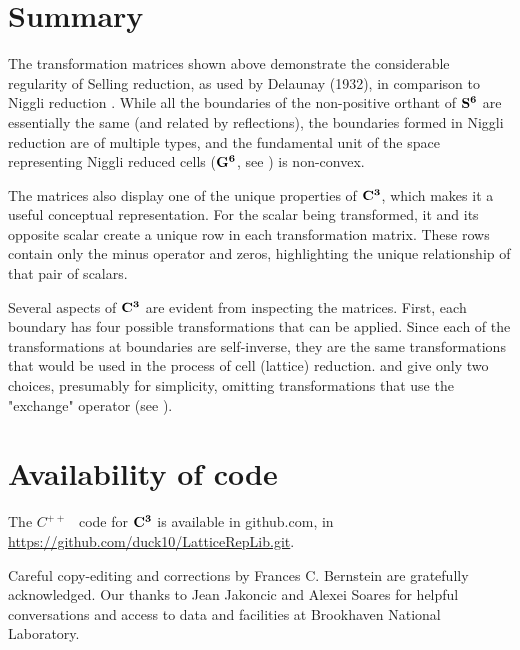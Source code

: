 \documentclass[preprint]{iucr}              %
\numberwithin{equation}{section}
\newcommand{\SVI}[0]{$\bf{S^{6}}$}
\newcommand{\GVI}[0]{$\bf{G^{6}}$}
\newcommand{\CIII}[0]{$\bf{C^{3}}$}
\begin{document}
	\section{Summary}
	
The transformation matrices shown above demonstrate the 
considerable regularity of Selling reduction, as used by 
Delaunay (1932), in comparison to Niggli 
reduction \cite{Niggli1928}. While all the boundaries of the non-positive 
orthant of \SVI{} are essentially the same (and 
related by reflections), the boundaries formed in 
Niggli reduction are of multiple types, and the fundamental unit 
of the space representing Niggli reduced cells (\GVI{}, see ) is non-convex.

The matrices also display one of the unique properties of \CIII{}, 
which makes it a useful conceptual representation. 
For the scalar being transformed, it and its opposite scalar
create a unique row in each transformation matrix. These rows contain only
the minus operator and zeros, highlighting the 
unique relationship of that pair of scalars.

Several aspects of \CIII{} are evident from inspecting the matrices. 
First, each boundary has four possible 
transformations that can be applied. Since each of 
the transformations at boundaries are self-inverse, they are the 
same transformations that would be used in the process of 
cell (lattice) reduction.  and  give only two choices, presumably for simplicity, 
omitting transformations that use the "exchange" operator 
(see ).

	
	
	
	
	
	\section{Availability of code}
	
	The $C^{++}$ ~code for \CIII{} is available in github.com, in
	\url{https://github.com/duck10/LatticeRepLib.git}.
	
	
	
	
	Careful copy-editing and corrections by Frances C. Bernstein are 
	gratefully acknowledged.
	Our thanks to Jean Jakoncic and Alexei Soares for 
	helpful conversations and access to data and facilities at 
	Brookhaven National Laboratory.
	
\end{document}
